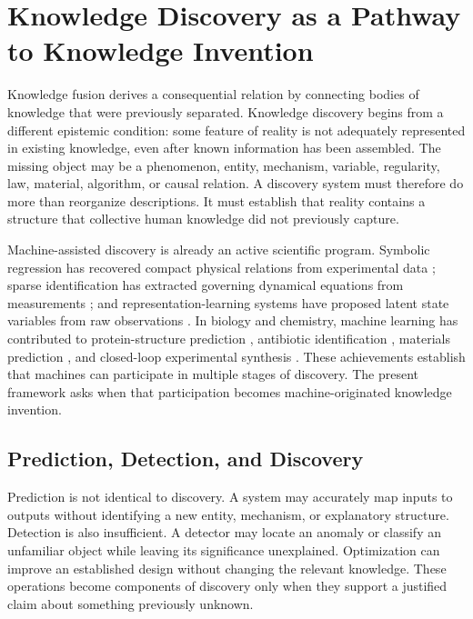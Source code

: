 \section{\textbf{Knowledge Discovery as a Pathway to Knowledge Invention}}
\label{sec:knowledge_discovery}

Knowledge fusion derives a consequential relation by connecting bodies of
knowledge that were previously separated. Knowledge discovery begins from a
different epistemic condition: some feature of reality is not adequately
represented in existing knowledge, even after known information has been
assembled. The missing object may be a phenomenon, entity, mechanism,
variable, regularity, law, material, algorithm, or causal relation. A discovery
system must therefore do more than reorganize descriptions. It must establish
that reality contains a structure that collective human knowledge did not
previously capture.

Machine-assisted discovery is already an active scientific program. Symbolic
regression has recovered compact physical relations from experimental data
\cite{schmidt2009laws,udrescu2020aifeynman}; sparse identification has extracted
governing dynamical equations from measurements \cite{brunton2016sindy}; and
representation-learning systems have proposed latent state variables from raw
observations \cite{chen2022variables}. In biology and chemistry, machine
learning has contributed to protein-structure prediction
\cite{jumper2021alphafold}, antibiotic identification
\cite{stokes2020antibiotic}, materials prediction
\cite{merchant2023materials}, and closed-loop experimental synthesis
\cite{szymanski2023autonomous}. These achievements establish that machines can
participate in multiple stages of discovery. The present framework asks when
that participation becomes machine-originated knowledge invention.

\subsection{\textbf{Prediction, Detection, and Discovery}}

Prediction is not identical to discovery. A system may accurately map inputs
to outputs without identifying a new entity, mechanism, or explanatory
structure. Detection is also insufficient. A detector may locate an anomaly or
classify an unfamiliar object while leaving its significance unexplained.
Optimization can improve an established design without changing the relevant
knowledge. These operations become components of discovery only when they
support a justified claim about something previously unknown.

